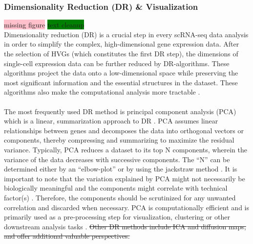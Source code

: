 \subsubsection{Dimensionality Reduction (DR) \& Visualization}
 \colorbox{pink}{missing figure} \colorbox{green}{text cleanup}\\
Dimensionality reduction (DR) is a crucial step in every scRNA-seq data analysis in order to simplify the complex, high-dimensional gene expression data. After the selection of HVGs (which constitutes the first DR step), the dimensions of single-cell expression data can be further reduced by DR-algorithms. These algorithms project the data onto a low-dimensional space while preserving the most significant information and the essential structures in the dataset. These algorithms also make the computational analysis more tractable \textbf{\cite{lueckenmalte_d_current_2019}}.\\\\
The most frequently used DR method is principal component analysis (PCA) \textbf{\cite{pearson_liii_1901}} which is a linear, summarization approach to DR \textbf{\cite{lueckenmalte_d_current_2019,heumos_best_2023}}. PCA assumes linear relationships between genes and decomposes the data into orthogonal vectors or components, thereby compressing and summarizing to maximize the residual variance. Typically, PCA reduces a dataset to its top N components, wherein the variance of the data decreases with successive components. The “N” can be determined either by an “elbow-plot” or by using the jackstraw method \textbf{\cite{macosko_highly_2015,lueckenmalte_d_current_2019,chung_statistical_2015}}. It is important to note that the variation explained by PCA might not necessarily be biologically meaningful and the components might correlate with technical factor(s) \textbf{\cite{finak_mast_2015}}. Therefore, the components should be scrutinized for any unwanted correlation and discarded when necessary. PCA is computationally efficient and is primarily used as a pre-processing step for visualization, clustering or other downstream analysis tasks \textbf{\cite{lueckenmalte_d_current_2019}}. \st{Other DR methods include ICA and diffusion maps, and offer additional valuable perspectives.}\\\\
